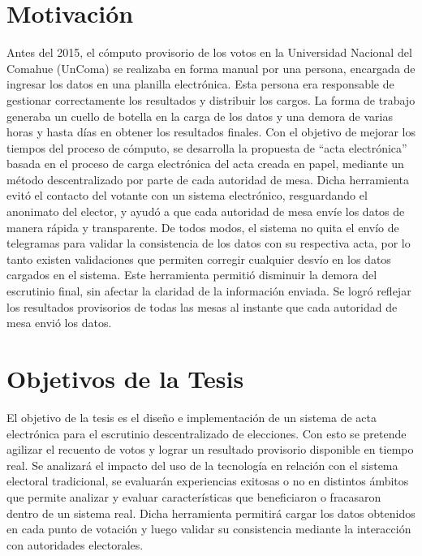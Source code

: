 \section{Motivación}
Antes del 2015, el cómputo provisorio de los votos en la Universidad Nacional del Comahue (UnComa) se realizaba en forma manual por una persona, encargada de ingresar los datos en una planilla electrónica. Esta persona era responsable de gestionar correctamente los resultados y distribuir los cargos. La forma de trabajo generaba un cuello de botella en la carga de los datos y una demora de varias horas y hasta días en obtener los resultados finales. \newline
Con el objetivo de mejorar los tiempos del proceso de cómputo, se desarrolla la propuesta de ``acta electrónica'' basada en el proceso de carga electrónica del acta creada en papel, mediante un método descentralizado  por parte de cada autoridad de mesa. Dicha herramienta evitó el contacto del votante con un sistema electrónico, resguardando el anonimato del elector, y ayudó a que cada autoridad de mesa envíe los datos de manera rápida y transparente. De todos modos, el sistema no quita el envío de telegramas para validar la consistencia de los datos con su respectiva acta, por lo tanto existen validaciones que permiten corregir cualquier desvío en los datos cargados en el sistema. Este herramienta permitió disminuir la demora del escrutinio final, sin afectar la claridad de la información enviada. Se logró reflejar los resultados provisorios de todas las mesas al instante que cada autoridad de mesa envió los datos.

\section{Objetivos de la Tesis}
El objetivo de la tesis es el diseño e implementación de un sistema de acta electrónica para el escrutinio descentralizado de elecciones. Con esto se pretende agilizar el recuento de votos y lograr un resultado provisorio disponible en tiempo real. Se analizará el impacto del uso de la tecnología en relación con el sistema electoral tradicional,
se evaluarán experiencias exitosas o no en distintos ámbitos que permite analizar y evaluar características que beneficiaron o fracasaron dentro de un sistema real.\newline
Dicha herramienta permitirá cargar los datos obtenidos en cada punto de votación y luego validar su consistencia mediante la interacción con autoridades electorales. 

